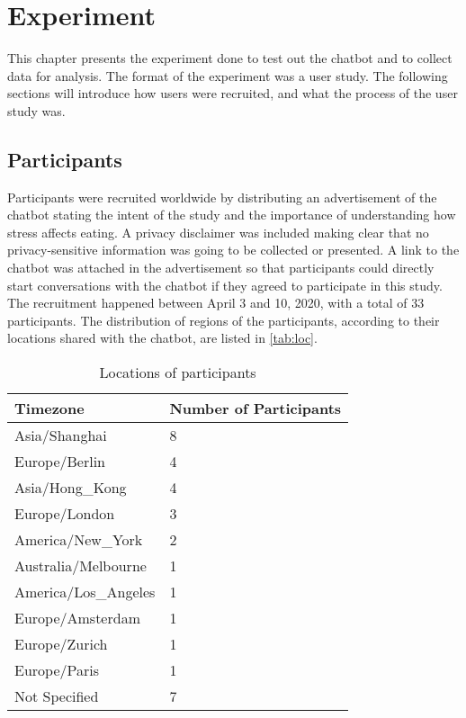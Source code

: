 
\chapter{Experiment}\label{chapter:experiment}
This chapter presents the experiment done to test out the chatbot and to collect data for analysis. The format of the experiment was a user study. The following sections will introduce how users were recruited, and what the process of the user study was.

\section{Participants}
Participants were recruited worldwide by distributing an advertisement of the chatbot stating the intent of the study and the importance of understanding how stress affects eating. A privacy disclaimer was included making clear that no privacy-sensitive information was going to be collected or presented. A link to the chatbot was attached in the advertisement so that participants could directly start conversations with the chatbot if they agreed to participate in this study. The recruitment happened between April 3 and 10, 2020, with a total of 33 participants. The distribution of regions of the participants, according to their locations shared with the chatbot, are listed in \autoref{tab:loc}.

\begin{table}[htpb]
  \caption[Locations of Participants]{Locations of participants}\label{tab:loc}
  \centering
  \begin{tabular}{l l}
    \toprule
      Timezone & Number of Participants \\
    \midrule
      Asia/Shanghai & 8 \\
      Europe/Berlin & 4 \\
      Asia/Hong\_Kong & 4 \\
      Europe/London & 3 \\
      America/New\_York & 2 \\
      Australia/Melbourne & 1 \\
      America/Los\_Angeles & 1 \\
      Europe/Amsterdam & 1 \\
      Europe/Zurich & 1 \\
      Europe/Paris & 1 \\
      Not Specified & 7 \\
    \bottomrule
  \end{tabular}
\end{table}

